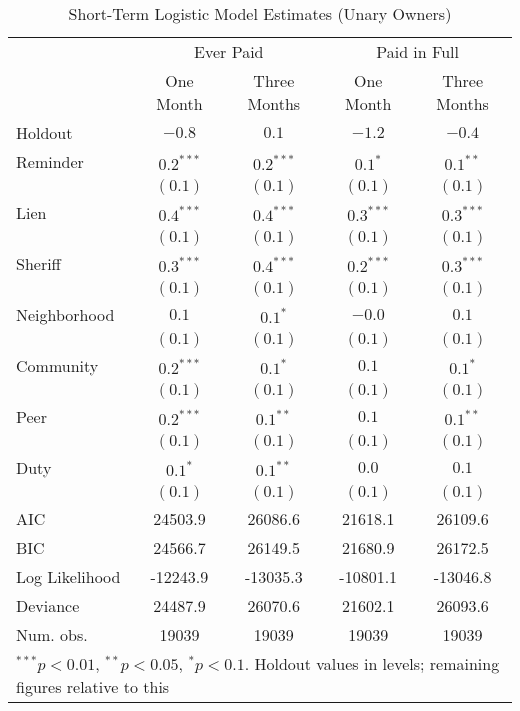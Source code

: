 \begin{table}[htbp]
\caption{Short-Term Logistic Model Estimates (Unary Owners)}
\begin{center}
\begin{tabular}{l c c c c }
\hline
 & \multicolumn{2}{c}{Ever Paid} & \multicolumn{2}{c}{Paid in Full} \\
 & One Month & Three Months & One Month & Three Months \\
Holdout        & $-0.8$ & $0.1$       & $-1.2$ & $-0.4$ \\
\hline
Reminder       & $0.2^{***}$  & $0.2^{***}$ & $0.1^{*}$    & $0.1^{**}$   \\
               & $(0.1)$      & $(0.1)$     & $(0.1)$      & $(0.1)$      \\
Lien           & $0.4^{***}$  & $0.4^{***}$ & $0.3^{***}$  & $0.3^{***}$  \\
               & $(0.1)$      & $(0.1)$     & $(0.1)$      & $(0.1)$      \\
Sheriff        & $0.3^{***}$  & $0.4^{***}$ & $0.2^{***}$  & $0.3^{***}$  \\
               & $(0.1)$      & $(0.1)$     & $(0.1)$      & $(0.1)$      \\
Neighborhood   & $0.1$        & $0.1^{*}$   & $-0.0$       & $0.1$        \\
               & $(0.1)$      & $(0.1)$     & $(0.1)$      & $(0.1)$      \\
Community      & $0.2^{***}$  & $0.1^{*}$   & $0.1$        & $0.1^{*}$    \\
               & $(0.1)$      & $(0.1)$     & $(0.1)$      & $(0.1)$      \\
Peer           & $0.2^{***}$  & $0.1^{**}$  & $0.1$        & $0.1^{**}$   \\
               & $(0.1)$      & $(0.1)$     & $(0.1)$      & $(0.1)$      \\
Duty           & $0.1^{*}$    & $0.1^{**}$  & $0.0$        & $0.1$        \\
               & $(0.1)$      & $(0.1)$     & $(0.1)$      & $(0.1)$      \\
\hline
AIC            & 24503.9      & 26086.6     & 21618.1      & 26109.6      \\
BIC            & 24566.7      & 26149.5     & 21680.9      & 26172.5      \\
Log Likelihood & -12243.9     & -13035.3    & -10801.1     & -13046.8     \\
Deviance       & 24487.9      & 26070.6     & 21602.1      & 26093.6      \\
Num. obs.      & 19039        & 19039       & 19039        & 19039        \\
\hline
\multicolumn{5}{l}{\scriptsize{$^{***}p<0.01$, $^{**}p<0.05$, $^*p<0.1$. Holdout values in levels; remaining figures relative to this}}
\end{tabular}
\label{sh_logit}
\end{center}
\end{table}

